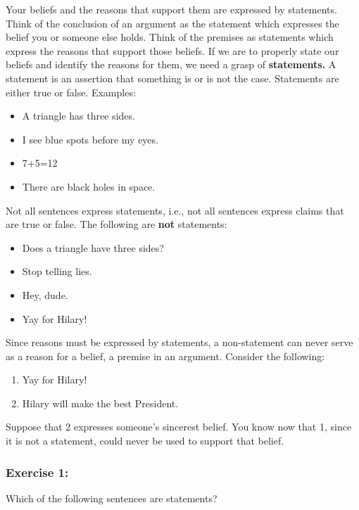 \documentclass[]{article}
\providecommand{\tightlist}{%
  \setlength{\itemsep}{0pt}\setlength{\parskip}{0pt}}
\begin{document}
Your beliefs and the reasons that support them are expressed by
statements. Think of the conclusion of an argument as the statement
which expresses the belief you or someone else holds. Think of the
premises as statements which express the reasons that support those
beliefs. If we are to properly state our beliefs and identify the
reasons for them, we need a grasp of \textbf{statements.} A statement is
an assertion that something is or is not the case. Statements are either
true or false. Examples:

\begin{itemize}
\tightlist
\item
  A triangle has three sides.
\item
  I see blue spots before my eyes.
\item
  7+5=12
\item
  There are black holes in space.
\end{itemize}

Not all sentences express statements, i.e., not all sentences express
claims that are true or false. The following are \textbf{not}
statements:

\begin{itemize}
\tightlist
\item
  Does a triangle have three sides?
\item
  Stop telling lies.
\item
  Hey, dude.
\item
  Yay for Hilary!
\end{itemize}

Since reasons must be expressed by statements, a non-statement can never
serve as a reason for a belief, a premise in an argument. Consider the
following:

\begin{enumerate}
\def\labelenumi{\arabic{enumi}.}
\tightlist
\item
  Yay for Hilary!
\item
  Hilary will make the best President.
\end{enumerate}

Suppose that 2 expresses someone's sincerest belief. You know now that
1, since it is not a statement, could never be used to support that
belief.

\subsubsection{Exercise 1:}\label{exercise-1}

Which of the following sentences are statements?
\end{document}
